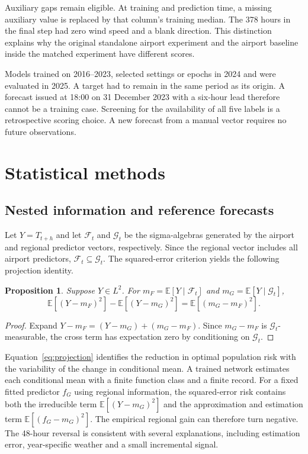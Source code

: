 \documentclass[11pt,letterpaper]{article}
\newtheorem{proposition}{Proposition}
\begin{document}
Auxiliary gaps remain eligible. At training and prediction time, a missing auxiliary value is replaced by that column's training median. The 378 hours in the final step had zero wind speed and a blank direction. This distinction explains why the original standalone airport experiment and the airport baseline inside the matched experiment have different scores.

Models trained on 2016--2023, selected settings or epochs in 2024 and were evaluated in 2025. A target had to remain in the same period as its origin. A forecast issued at 18:00 on 31 December 2023 with a six-hour lead therefore cannot be a training case. Screening for the availability of all five labels is a retrospective scoring choice. A new forecast from a manual vector requires no future observations.


\FloatBarrier
\section{Statistical methods}\label{methods}


\subsection{Nested information and reference forecasts}\label{information}
Let $Y=T_{t+h}$ and let $\mathcal F_t$ and $\mathcal G_t$ be the sigma-algebras generated by the airport and regional predictor vectors, respectively. Since the regional vector includes all airport predictors, $\mathcal F_t\subseteq\mathcal G_t$. The squared-error criterion yields the following projection identity.
\begin{proposition}\label{prop:information}
Suppose $Y\in L^2$. For $m_F=\mathbb E[Y\mid\mathcal F_t]$ and $m_G=\mathbb E[Y\mid\mathcal G_t]$,
\begin{equation}\label{eq:projection}
\mathbb E[(Y-m_F)^2]-\mathbb E[(Y-m_G)^2]=\mathbb E[(m_G-m_F)^2].
\end{equation}
\end{proposition}
\begin{proof}
Expand $Y-m_F=(Y-m_G)+(m_G-m_F)$. Since $m_G-m_F$ is $\mathcal G_t$-measurable, the cross term has expectation zero by conditioning on $\mathcal G_t$.
\end{proof}
Equation~\eqref{eq:projection} identifies the reduction in optimal population risk with the variability of the change in conditional mean. A trained network estimates each conditional mean with a finite function class and a finite record. For a fixed fitted predictor $f_G$ using regional information, the squared-error risk contains both the irreducible term $\mathbb E[(Y-m_G)^2]$ and the approximation and estimation term $\mathbb E[(f_G-m_G)^2]$. The empirical regional gain can therefore turn negative. The 48-hour reversal is consistent with several explanations, including estimation error, year-specific weather and a small incremental signal.
\end{document}
